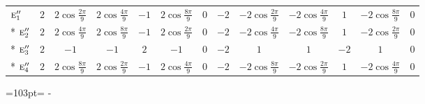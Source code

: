 \documentclass[10pt,a4paper]{article}
\newcommand{\needspace}[1]{\par\penalty-100\begingroup\dimen0=#1\relax\dimen2=\pagegoal
  \advance\dimen2-\pagetotal\ifdim\dimen0>\dimen2\relax\ifdim\dimen2>0pt\vfil\break\fi\fi
  \endgroup}
\numberwithin{equation}{section}
\newcommand{\irr}[1]{\text{\normalfont\scshape #1}}
\begin{document}
{{\begin{longtable}{@{}lcccccccccccc@{}}
$\irr{e}_{1}''$ & $2$ & $2\cos\tfrac{2\pi}{9}$ & $2\cos\tfrac{4\pi}{9}$ & $-1$ & $2\cos\tfrac{8\pi}{9}$ & $0$ & $-2$ & $-2\cos\tfrac{2\pi}{9}$ & $-2\cos\tfrac{4\pi}{9}$ & $1$ & $-2\cos\tfrac{8\pi}{9}$ & $0$\\*
$\irr{e}_{2}''$ & $2$ & $2\cos\tfrac{4\pi}{9}$ & $2\cos\tfrac{8\pi}{9}$ & $-1$ & $2\cos\tfrac{2\pi}{9}$ & $0$ & $-2$ & $-2\cos\tfrac{4\pi}{9}$ & $-2\cos\tfrac{8\pi}{9}$ & $1$ & $-2\cos\tfrac{2\pi}{9}$ & $0$\\*
$\irr{e}_{3}''$ & $2$ & $-1$ & $-1$ & $2$ & $-1$ & $0$ & $-2$ & $1$ & $1$ & $-2$ & $1$ & $0$\\*
$\irr{e}_{4}''$ & $2$ & $2\cos\tfrac{8\pi}{9}$ & $2\cos\tfrac{2\pi}{9}$ & $-1$ & $2\cos\tfrac{4\pi}{9}$ & $0$ & $-2$ & $-2\cos\tfrac{8\pi}{9}$ & $-2\cos\tfrac{2\pi}{9}$ & $1$ & $-2\cos\tfrac{4\pi}{9}$ & $0$\\
\bottomrule\end{longtable}}}
\needspace{103pt}
\end{document}
